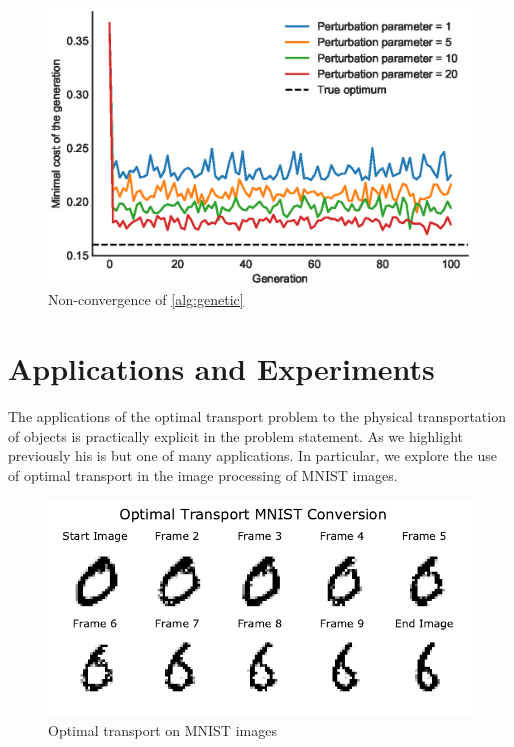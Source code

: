 \documentclass{article}
\theoremstyle{definition}
\theoremstyle{remark}
\begin{document}
\begin{figure}[tb]
  \centering
  \includegraphics{figs/genetic.eps}
  \caption{Non-convergence of \cref{alg:genetic}}
  \label{fig:genetic_fail}
\end{figure}




\section{Applications and Experiments} %
\label{sec:applications_}

The applications of the optimal transport problem to the physical transportation
of objects is practically explicit in the problem statement. As we highlight
previously his is but one of many applications. In particular, we explore the
use of optimal transport in the image processing of MNIST images.

\begin{figure}[tb]
  \centering
  \includegraphics{../../code/ot-mnist-evol.pdf}
  \caption{Optimal transport on MNIST images}
  \label{fig:mnisttransport}
\end{figure}
\end{document}
